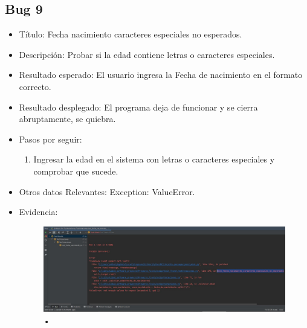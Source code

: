 \documentclass[conference]{IEEEtran}
\begin{document}
\subsection*{Bug 9}
\begin{itemize}
\item Título: Fecha nacimiento caracteres especiales no esperados.

\item Descripción: Probar si la edad contiene letras o caracteres especiales.

\item Resultado esperado: El usuario ingresa la Fecha de nacimiento en el formato correcto.

\item Resultado desplegado: El programa deja de funcionar y se cierra abruptamente, se quiebra. 

\item Pasos por seguir: 
\begin{enumerate}
\item Ingresar la edad en el sistema con letras o caracteres especiales y comprobar que sucede.
\end{enumerate}
\item Otros datos Relevantes: Exception: ValueError.
\item Evidencia:
\begin{figure}[H]
\centering
\includegraphics[scale=0.2]{imagenes/fecha_caracteres.jpeg}
\caption{•}
\end{figure}

\end{itemize}
\end{document}
